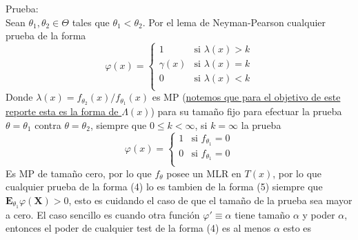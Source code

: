 \documentclass[peerreview]{IEEEtran}
\begin{document}
Prueba:\\
Sean $\theta_1, \theta_2 \in \Theta$ tales que $ \theta_1 < \theta_2$. Por el lema de Neyman-Pearson cualquier prueba de la forma 
\begin{equation}
			\varphi(x)= \left\{ \begin{array}{lr}
							1 &	\textrm{si  } \lambda(x) >  k\\
							\gamma(x)  & \textrm{si  } \lambda(x) = k  \\ 
							0 & \textrm{si  } \lambda(x) < k \\
							\end{array}
					\right.
\end{equation}
Donde $\lambda(x)= f_{\theta_2}(x)/f_{\theta_1}(x)$ es MP (\ul{notemos que para el objetivo de este reporte esta es la forma de $\Lambda(x)$}) para su tamaño fijo para efectuar la prueba $\theta = \theta_1$ contra $\theta = \theta_2$, siempre que $0 \leq k < \infty$, si $ k = \infty$ la prueba
\begin{equation}
			\varphi(x)= \left\{ \begin{array}{lr}
							1 &	\textrm{si  } f_{\theta_1}=0\\
							0 & \textrm{si  } f_{\theta_1}=0 \\ 
\end{array}
					\right.
\end{equation}
Es MP de tamaño cero, por lo que $f_\theta$ posee un MLR en $T(x)$, por lo que cualquier prueba de la forma (4) lo es tambien de la forma (5) siempre que $\mathbf{E}_{\theta_1}\varphi(\mathbf{X}) >0$, esto es cuidando el caso de que el tamaño de la prueba sea mayor a cero. El caso sencillo es cuando otra función $\varphi' \equiv \alpha$ tiene tamaño $\alpha$ y poder $\alpha$, entonces el poder de cualquier test de la forma (4) es al menos $\alpha$ esto es  
\end{document}
